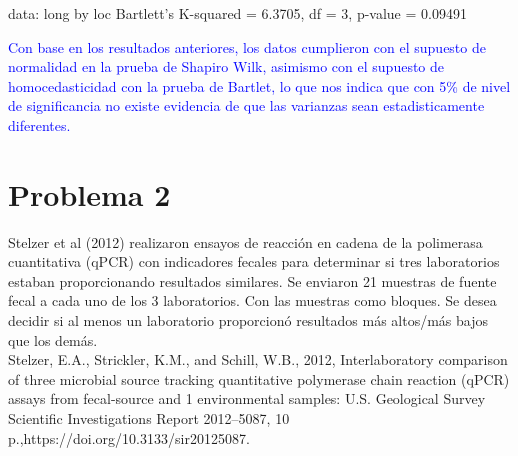 \documentclass[a4paper,12pt]{article}
\begin{document}
\begin{enumerate} [label=\textbf{\alph*})]
\begin{MyVerbatim}
data:  long by loc
Bartlett's K-squared = 6.3705, df = 3, p-value = 0.09491
\end{MyVerbatim}
\textcolor{blue}{Con base en los resultados anteriores, los datos cumplieron con el supuesto de normalidad en la prueba de Shapiro Wilk, asimismo con el supuesto de homocedasticidad con la prueba de Bartlet, lo que nos indica que con 5\% de nivel de significancia no existe evidencia de que las varianzas sean estadisticamente diferentes. }
	\end{enumerate}
\newpage		
\section*{Problema 2}
Stelzer et al (2012) realizaron ensayos de reacción en cadena de la polimerasa cuantitativa (qPCR) con indicadores fecales para determinar si tres laboratorios estaban proporcionando resultados similares. Se enviaron 21 muestras de fuente fecal a cada uno de los 3 laboratorios. Con las muestras como bloques. Se desea decidir si al menos un laboratorio proporcionó resultados más altos/más bajos que los demás.\\
Stelzer, E.A., Strickler, K.M., and Schill, W.B., 2012, Interlaboratory comparison of three microbial source tracking quantitative polymerase chain reaction (qPCR) assays from fecal-source and 1 environmental samples: U.S. Geological Survey Scientific Investigations Report 2012–5087, 10 p.,https://doi.org/10.3133/sir20125087.
\end{document}
